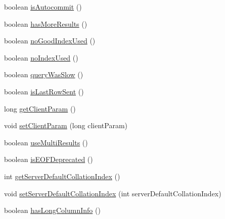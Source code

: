 \begin{DoxyCompactItemize}
\item 
boolean \mbox{\hyperlink{classcom_1_1mysql_1_1cj_1_1protocol_1_1a_1_1_native_server_session_a443cf8223386212f9812b802f1821d00}{is\+Autocommit}} ()
\item 
boolean \mbox{\hyperlink{classcom_1_1mysql_1_1cj_1_1protocol_1_1a_1_1_native_server_session_ac688e04f00ac979c7e9430c998d12ae0}{has\+More\+Results}} ()
\item 
boolean \mbox{\hyperlink{classcom_1_1mysql_1_1cj_1_1protocol_1_1a_1_1_native_server_session_ad51925b4903a656610eed30bfaa51562}{no\+Good\+Index\+Used}} ()
\item 
boolean \mbox{\hyperlink{classcom_1_1mysql_1_1cj_1_1protocol_1_1a_1_1_native_server_session_aca343c9466cb45a783268924ce14b277}{no\+Index\+Used}} ()
\item 
boolean \mbox{\hyperlink{classcom_1_1mysql_1_1cj_1_1protocol_1_1a_1_1_native_server_session_a1c74717444fce778adbd567143aa950a}{query\+Was\+Slow}} ()
\item 
boolean \mbox{\hyperlink{classcom_1_1mysql_1_1cj_1_1protocol_1_1a_1_1_native_server_session_adade829bf44ed55a8ac1a93ae5716a4b}{is\+Last\+Row\+Sent}} ()
\item 
long \mbox{\hyperlink{classcom_1_1mysql_1_1cj_1_1protocol_1_1a_1_1_native_server_session_a027379497479b7a43755ff49ad37e96f}{get\+Client\+Param}} ()
\item 
void \mbox{\hyperlink{classcom_1_1mysql_1_1cj_1_1protocol_1_1a_1_1_native_server_session_a6b2f480c08fa965e6559157f71a86970}{set\+Client\+Param}} (long client\+Param)
\item 
boolean \mbox{\hyperlink{classcom_1_1mysql_1_1cj_1_1protocol_1_1a_1_1_native_server_session_a1ee7647193508670b38da91c9f39e11f}{use\+Multi\+Results}} ()
\item 
boolean \mbox{\hyperlink{classcom_1_1mysql_1_1cj_1_1protocol_1_1a_1_1_native_server_session_adeaa0a01acf79d5b609ce8757822948d}{is\+E\+O\+F\+Deprecated}} ()
\item 
int \mbox{\hyperlink{classcom_1_1mysql_1_1cj_1_1protocol_1_1a_1_1_native_server_session_aeaccfa02aeae2a872f2d92412a051de0}{get\+Server\+Default\+Collation\+Index}} ()
\item 
void \mbox{\hyperlink{classcom_1_1mysql_1_1cj_1_1protocol_1_1a_1_1_native_server_session_abd6266538f2562073361edbc958a3304}{set\+Server\+Default\+Collation\+Index}} (int server\+Default\+Collation\+Index)
\item 
boolean \mbox{\hyperlink{classcom_1_1mysql_1_1cj_1_1protocol_1_1a_1_1_native_server_session_ac5dca7c3f6c90dc330ed8fb7f7c74069}{has\+Long\+Column\+Info}} ()

\end{DoxyCompactItemize}

